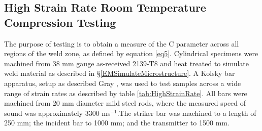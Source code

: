 	
	\subsection{High Strain Rate Room Temperature Compression Testing}	
	\label{EMKolsky}
	The purpose of testing is to obtain a measure of the C parameter across all regions of the weld zone, as defined by equation \ref{eq5}. Cylindrical specimens were machined from 38 mm gauge as-received 2139-T8 and heat treated to simulate weld material as described in \S\ref{EMSimulateMicrostructure}. A Kolsky bar apparatus, setup as described Gray%
	, was used to test samples across a wide range of strain rates as described by table \ref{tab:HighStrainRate}. All bars were machined from 20 mm diameter mild steel rods, where the measured speed of sound was approximately 3300 ms$^{-1}$.The striker bar was machined to a length of 250 mm; the incident bar to 1000 mm; and the transmitter to 1500 mm. 
	
